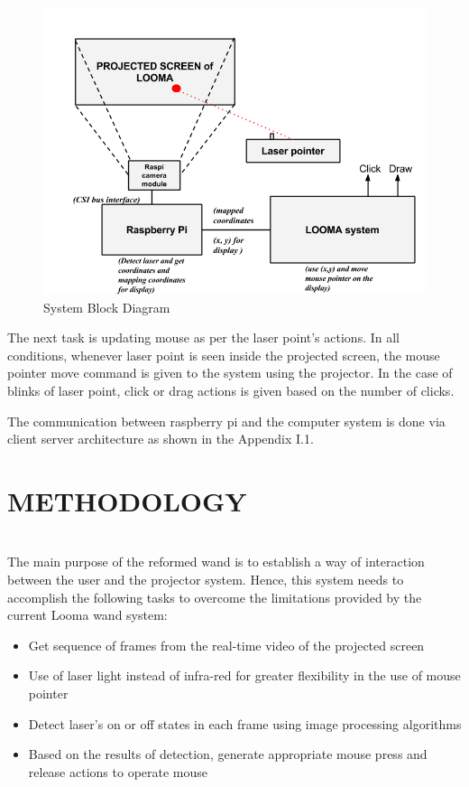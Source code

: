\documentclass[12pt, a4paper]{article}
\begin{document}
\begin{figure}[htp]
\centering
\includegraphics[scale=0.6]{proposed_system}
\caption{System Block Diagram}
\label{Block Diagram}
\end{figure}
The next task is updating mouse as per the laser point's actions. In all conditions, whenever laser point is seen inside the projected screen, the mouse pointer move command is given to the system using the projector. In the case of blinks of laser point, click or drag actions is given based on the number of clicks. 

The communication between raspberry pi and the computer system is done via client server architecture as shown in the Appendix I.1.
\newpage
\section{METHODOLOGY}
~\\
The main purpose of the reformed wand is to establish a way of interaction between the user and the projector system. Hence, this system needs to accomplish the following tasks to overcome the limitations provided by the current Looma wand system:
\begin{itemize}
\item Get sequence of frames from the real-time video of the projected screen
\item Use of laser light instead of infra-red for greater flexibility in the use of mouse pointer
\item Detect laser’s on or off states in each frame using image processing algorithms
\item Based on the results of detection, generate appropriate mouse press and release actions to operate mouse
\end{itemize}
\end{document}
